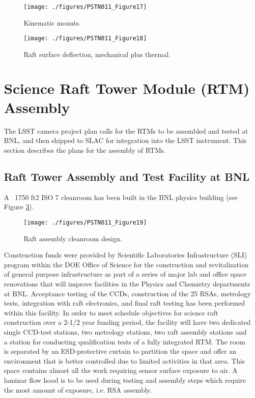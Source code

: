 \begin{figure}[htbp]
\begin{center}
\texttt{[image: ./figures/PSTN011\_Figure17]}
\caption{Kinematic mounts.}
\label{fig:Fig17}
\end{center}
\end{figure}
 
 \begin{figure}[htbp]
\begin{center}
\texttt{[image: ./figures/PSTN011\_Figure18]}
\caption{Raft surface deflection, mechanical plus thermal.}
\label{fig:Fig18}
\end{center}
\end{figure}
 
\section{Science Raft Tower Module (RTM) Assembly}

The LSST camera project plan calls for the RTMs to be assembled and tested at BNL, and then shipped to SLAC for integration into the LSST instrument. This section describes the plans for the assembly of RTMs. 

\subsection{Raft Tower Assembly and Test Facility at BNL}
A ~1750 ft2 ISO 7 cleanroom has been built in the BNL physics building (see Figure \ref{fig:Fig19}).

\begin{figure}[htbp]
\begin{center}
\texttt{[image: ./figures/PSTN011\_Figure19]}
\caption{Raft assembly cleanroom design.}
\label{fig:Fig19}
\end{center}
\end{figure} 

Construction funds were provided by Scientific Laboratories Infrastructure (SLI) program within the DOE Office of Science for the construction and revitalization of general purpose infrastructure as part of a series of major lab and office space renovations that will improve facilities in the Physics and Chemistry departments at BNL. 
Acceptance testing of the CCDs, construction of the 25 RSAs, metrology tests, integration with raft electronics, and final raft testing has been performed within this facility. In order to meet schedule objectives for science raft construction over a 2-1/2 year funding period, the facility will have two dedicated single CCD-test stations, two metrology stations, two raft assembly stations and a station for conducting qualification tests of a fully integrated RTM. The room is separated by an ESD-protective curtain to partition the space and offer an environment that is better controlled due to limited activities in that area. This space contains almost all the work requiring sensor surface exposure to air. A laminar flow hood is to be used during testing and assembly steps which require the most amount of exposure, i.e. RSA assembly. 

